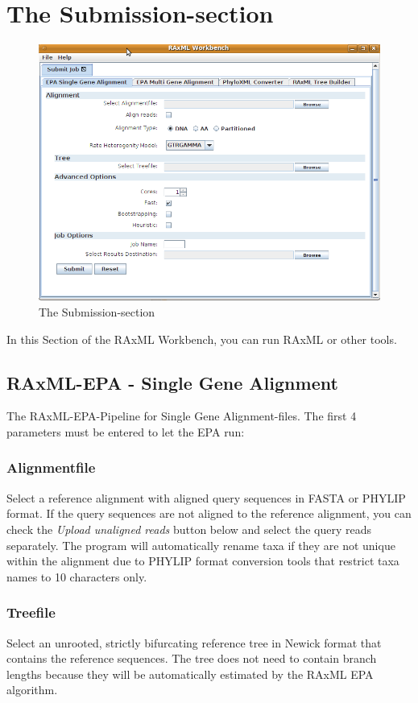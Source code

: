 \documentclass{article}
\begin{document}
\section{The Submission-section}
	\begin{figure}[htb]
		\centering
		\includegraphics[scale=0.30]{./Submission}
		\caption{The Submission-section}
		\label{fig1}
	\end{figure}
	\noindent In this Section of the RAxML Workbench, you can run RAxML or other tools. 	
	\subsection{RAxML-EPA - Single Gene Alignment}
	The RAxML-EPA-Pipeline for Single Gene Alignment-files. The first 4 parameters must be entered to let the EPA run:
	\subsubsection*{Alignmentfile}
	Select a reference alignment with aligned query sequences in FASTA or PHYLIP format. If the query sequences are not aligned to the reference alignment, you can check the \textit{Upload unaligned reads} button below and select the query reads separately. The program will automatically rename taxa if they are not unique within the alignment due to PHYLIP format conversion tools that restrict taxa names to 10 characters only.
	\subsubsection*{Treefile}
	Select an unrooted, strictly bifurcating reference tree in Newick format that contains the reference sequences. The tree does not need to contain branch lengths because they will be automatically estimated by the RAxML EPA algorithm.
\end{document}
